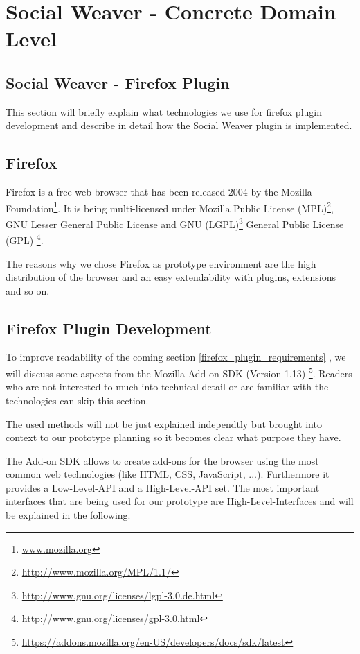 \section{Social Weaver - Concrete Domain Level}\label{sowe-concrete}

\subsection{Social Weaver - Firefox Plugin} \label{sowe-firefox}
This section will briefly explain what technologies we use for firefox plugin development and describe in detail how the Social Weaver plugin is implemented.

\subsection*{Firefox}
Firefox is a free web browser that has been released 2004 by the Mozilla Foundation\footnote{\url{www.mozilla.org}}. It is being multi-licensed under Mozilla Public License (MPL)\footnote{\url{http://www.mozilla.org/MPL/1.1/}}, GNU Lesser General Public License and GNU (LGPL)\footnote{\url{http://www.gnu.org/licenses/lgpl-3.0.de.html}} General Public License (GPL) \footnote{\url{http://www.gnu.org/licenses/gpl-3.0.html}}. 

The reasons why we chose Firefox as prototype environment are the high distribution of the browser and an easy extendability with plugins, extensions and so on.

\subsection*{Firefox Plugin Development}
To improve readability of the coming section \ref{firefox_plugin_requirements} , we will discuss some aspects from the Mozilla Add-on SDK (Version 1.13) \footnote{\url{https://addons.mozilla.org/en-US/developers/docs/sdk/latest}}. Readers who are not interested to much into technical detail or are familiar with the technologies can skip this section.

The used methods will not be just explained independtly but brought into context to our prototype planning so it becomes clear what purpose they have. 

The Add-on SDK allows to create add-ons for the browser using the most common web technologies (like HTML, CSS, JavaScript, ...). Furthermore it provides a Low-Level-API and a High-Level-API set. The most important interfaces that are being used for our prototype are High-Level-Interfaces and will be explained in the following.

